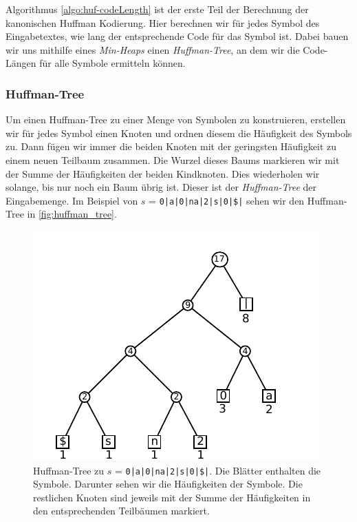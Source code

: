 \documentclass[a4paper,11pt]{scrartcl}%
\theoremstyle{change}
\theoremstyle{nonumberplain}
\theoremstyle{change}
\theoremstyle{nonumberplain}
\theoremstyle{change}
\theoremstyle{nonumberplain}
\begin{document}
Algorithmus \ref{algo:huf-codeLength} ist der erste Teil der Berechnung der kanonischen Huffman Kodierung. Hier berechnen wir für jedes Symbol des Eingabetextes, wie lang der entsprechende Code für das Symbol ist. Dabei bauen wir uns mithilfe eines \textit{Min-Heaps} einen \textit{Huffman-Tree}, an dem wir die Code-Längen für alle Symbole ermitteln können.

\subsubsection{Huffman-Tree}

Um einen Huffman-Tree zu einer Menge von Symbolen zu konstruieren, erstellen wir für jedes Symbol einen Knoten und ordnen diesem die Häufigkeit des Symbols zu. Dann fügen wir immer die beiden Knoten mit der geringsten Häufigkeit zu einem neuen Teilbaum zusammen. Die Wurzel dieses Baums markieren wir mit der Summe der Häufigkeiten der beiden Kindknoten.
Dies wiederholen wir solange, bis nur noch ein Baum übrig ist. Dieser ist der \textit{Huffman-Tree} der Eingabemenge\cite[S. 39]{storerDataCompression}. Im Beispiel von $s$ = \texttt{0|a|0|na|2|s|0|\$|} sehen wir den Huffman-Tree in \autoref{fig:huffman_tree}.

	\begin{figure}[h]
		\begin{center}
		
		 \includegraphics[scale=0.9]{./pics/huffman_Tree}
		 \end{center}
		
		\caption{Huffman-Tree zu $s$ = \texttt{0|a|0|na|2|s|0|\$|}. Die Blätter enthalten die Symbole. Darunter sehen wir die Häufigkeiten der Symbole. Die restlichen Knoten sind jeweils mit der Summe der Häufigkeiten in den entsprechenden Teilbäumen markiert.}
		\label{fig:huffman_tree}
	\end{figure}
	
\end{document}
